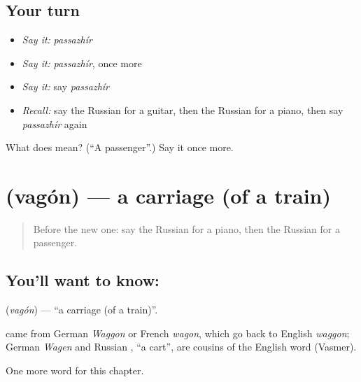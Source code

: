 \subsection*{Your turn}
\begin{itemize}
\raggedright
  \item \emph{Say it:} \emph{passazhír}
  \item \emph{Say it:} \emph{passazhír}, once more
  \item \emph{Say it:} say \emph{passazhír}
  \item \emph{Recall:} say the Russian for a guitar, then the Russian for a piano, then say \emph{passazhír} again
\end{itemize}

\begin{tcolorbox}[breakable,colback=teal!4,colframe=teal!35!black,title={Before you move on}]
What does  mean? (\textquotedblleft{}A passenger\textquotedblright{}.) Say it once more.
\end{tcolorbox}
\section[\texorpdfstring{\ru{вагон} (vagón)}{вагон (vagón)}]{ (vagón) — a carriage (of a train)}

\label{lesson:RU-C198-vagon}



\begin{quote}
Before the new one: say the Russian for a piano, then the Russian for a passenger.
\end{quote}

\subsection*{You'll want to know: }
\textbf{} (\emph{vagón}) — \textquotedblleft{}a carriage (of a train)\textquotedblright{}.

\begin{cousinweb}
\textbf{} came from German \emph{Waggon} or French \emph{wagon}, which go back to English \emph{waggon}; German \emph{Wagen} and Russian \emph{}, \textquotedblleft{}a cart\textquotedblright{}, are cousins of the English word (Vasmer).
\end{cousinweb}

\begin{grammarlens}[title={What you've built}]
One more word for this chapter.
\end{grammarlens}

